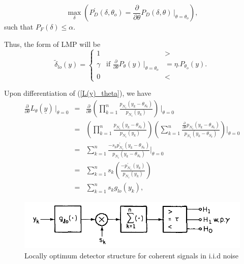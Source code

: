 \documentclass[a4paper,english,12pt]{article}
\begin{document}
\begin{exmp}
\begin{note}
\begin{equation}
\max_{\delta} \left(P_{D}^\prime(\delta,\theta_{o})=\frac{\partial}{\partial\theta}P_{D}(\delta,\theta)\hspace{2pt}\Bigg|_{\theta=\theta_{o}} \right),\nonumber
\end{equation}
such that $P_{F}(\delta)\leq\alpha$.
\par Thus, the form of LMP will be
\begin{equation}
\tilde\delta_{lo}(y)=\begin{cases}
1&>\\
\gamma\hspace{10pt}\text{if }\frac{\partial}{\partial\theta}P_{\theta}(y)\hspace{2pt}\big|_{\theta=\theta_{o}}&=\eta.P_{\theta_{o}}(y).\\
0&<
\end{cases}
\end{equation} 
\end{note}
Upon differentiation of (\ref{L(y)_theta}), we have
\begin{eqnarray}
\frac{{\partial}}{\partial\theta}L_{\theta}(\underline{y})\hspace{2pt}|_{\theta=0}&=&\frac{\partial}{\partial\theta}\left(\prod_{k=1}^n\frac{p_{N_{1}}(y_{k}-\theta_{S_{k}})}{p_{N_{1}}(y_{k})}\right)\hspace{2pt}\Bigg|_{\theta=0}\nonumber\\
&=&\left(\prod_{k=1}^n\frac{p_{N_{1}}(y_{k}-\theta_{S_{k}})}{p_{N_{1}}(y_{k})}\right)\left(\sum_{k=1}^{n}\frac{\frac{\partial}{\partial\theta}p_{N_{1}}(y_{k}-\theta_{S_{k}})}{p_{N_{1}}(y_{k}-\theta_{S_{k}})}\right)\Bigg|_{\theta=0}\nonumber\\
&=&\sum_{k=1}^{n}\frac{-s_{k}p_{N_{1}}^\prime(y_{k}-\theta_{S_{k}})}{p_{N_{1}}(y_{k}-\theta_{S_{k}})}\Bigg|_{\theta=0}\nonumber\\
&=&\sum_{k=1}^{n}s_{k}\left(\frac{-p_{N_{1}}^\prime(y_{k})}{p_{N_{1}}(y_{k})}\right)\nonumber\\
&=&\sum_{k=1}^{n}s_{k}g_{lo}(y_{k}),
\end{eqnarray}
\begin{figure}[h]
\centering
\captionsetup{justification=centering}
\includegraphics[width=0.8\linewidth]{Figures/lec10Fig4}
\caption{Locally optimum detector structure for coherent signals in i.i.d noise}

\end{figure}
\end{exmp}
\end{document}
